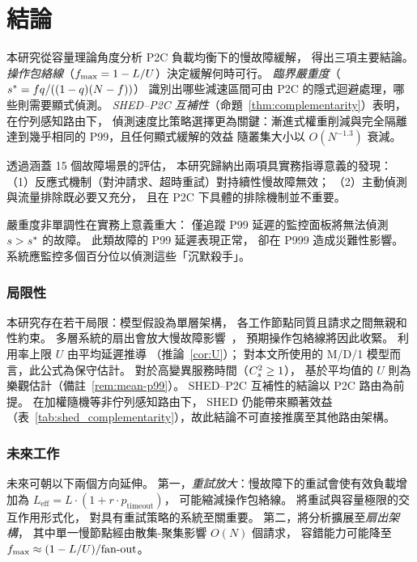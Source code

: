 \section{結論}
\label{sec:conclusion}

本研究從容量理論角度分析 P2C 負載均衡下的慢故障緩解，
得出三項主要結論。
\emph{操作包絡線}（$f_{\max} = 1 - L/U$）決定緩解何時可行。
\emph{臨界嚴重度}（$s^{*} = fq/((1-q)(N-f))$）
識別出哪些減速區間可由 P2C 的隱式迴避處理，哪些則需要顯式偵測。
\emph{SHED--P2C 互補性}（命題~\ref{thm:complementarity}）表明，在佇列感知路由下，
偵測速度比策略選擇更為關鍵：漸進式權重削減與完全隔離
達到幾乎相同的 P99，且任何顯式緩解的效益
隨叢集大小以 $O(N^{-1.3})$ 衰減。

透過涵蓋 15 個故障場景的評估，
本研究歸納出兩項具實務指導意義的發現：
（1）反應式機制（對沖請求、超時重試）對持續性慢故障無效；
（2）主動偵測與流量排除既必要又充分，
且在 P2C 下具體的排除機制並不重要。

嚴重度非單調性在實務上意義重大：
僅追蹤 P99 延遲的監控面板將無法偵測 $s > s^{*}$ 的故障。
此類故障的 P99 延遲表現正常，
卻在 P999 造成災難性影響。
系統應監控多個百分位以偵測這些「沉默殺手」。

\subsubsection*{局限性}

本研究存在若干局限：模型假設為單層架構，
各工作節點同質且請求之間無親和性約束。
多層系統的扇出會放大慢故障影響~\cite{dean2013tail}，
預期操作包絡線將因此收緊。
利用率上限 $U$ 由平均延遲推導
（推論~\ref{cor:U}）；
對本文所使用的 M/D/1 模型而言，此公式為保守估計。
對於高變異服務時間（$C_s^2 \geq 1$），
基於平均值的 $U$ 則為樂觀估計（備註~\ref{rem:mean-p99}）。
SHED--P2C 互補性的結論以 P2C 路由為前提。
在加權隨機等非佇列感知路由下，
SHED 仍能帶來顯著效益（表~\ref{tab:shed_complementarity}），故此結論不可直接推廣至其他路由架構。

\subsubsection*{未來工作}

未來可朝以下兩個方向延伸。
第一，\emph{重試放大}：慢故障下的重試會使有效負載增加為
$L_{\text{eff}} = L \cdot (1 + r \cdot p_{\text{timeout}})$，
可能縮減操作包絡線。
將重試與容量極限的交互作用形式化，
對具有重試策略的系統至關重要。
第二，將分析擴展至\emph{扇出架構}，
其中單一慢節點經由散集-聚集影響 $O(N)$ 個請求，
容錯能力可能降至
$f_{\max} \approx (1-L/U)/\text{fan-out}$。
